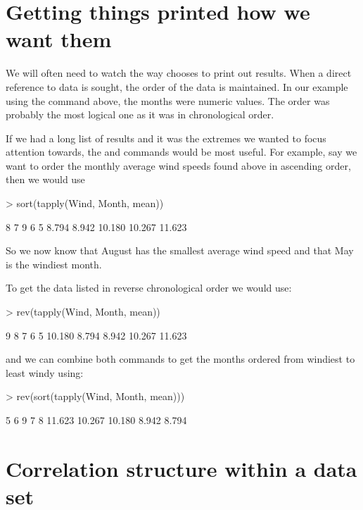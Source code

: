 \section{Getting things printed how we want them}

We will often need to watch the way \R{} chooses to print out results. When a direct reference to data is sought, the order of the data is maintained. In our example using the  command above, the months were numeric values. The order was probably the most logical one as it was in chronological order.

If we had a long list of results and it was the extremes we wanted to focus attention towards, the  and  commands would be most useful. For example, say we want to order the monthly average wind speeds found above in ascending order, then we would use
\begin{Schunk}
\begin{Sinput}
> sort(tapply(Wind, Month, mean))
\end{Sinput}
\begin{Soutput}
     8      7      9      6      5 
 8.794  8.942 10.180 10.267 11.623 
\end{Soutput}
\end{Schunk}
So we now know that August has the smallest average wind speed and that May is the windiest month.

To get the data listed in reverse chronological order we would use:
\begin{Schunk}
\begin{Sinput}
> rev(tapply(Wind, Month, mean))
\end{Sinput}
\begin{Soutput}
     9      8      7      6      5 
10.180  8.794  8.942 10.267 11.623 
\end{Soutput}
\end{Schunk}
and we can combine both commands to get the months ordered from windiest to least windy using:
\begin{Schunk}
\begin{Sinput}
> rev(sort(tapply(Wind, Month, mean)))
\end{Sinput}
\begin{Soutput}
     5      6      9      7      8 
11.623 10.267 10.180  8.942  8.794 
\end{Soutput}
\end{Schunk}

\section{Correlation structure within a data set}
\label{CorrelationStructure}


